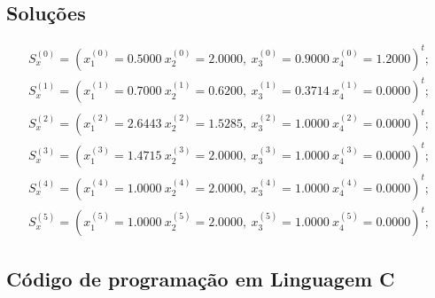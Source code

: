 \documentclass[12pt,a4paper]{article}
\begin{document}
        \subsection{Soluções}

            \begin{align*}
                S_x^{(0)} = (x_1^{(0)} = 0.5000\ x_2^{(0)}= 2.0000,\ x_3^{(0)}= 0.9000\ x_4^{(0)}= 1.2000)^t;\\
                S_x^{(1)} = (x_1^{(1)} = 0.7000\ x_2^{(1)}= 0.6200,\ x_3^{(1)}= 0.3714\ x_4^{(1)}= 0.0000)^t;\\
                S_x^{(2)} = (x_1^{(2)} = 2.6443\ x_2^{(2)}= 1.5285,\ x_3^{(2)}= 1.0000\ x_4^{(2)}= 0.0000)^t;\\
                S_x^{(3)} = (x_1^{(3)} = 1.4715\ x_2^{(3)}= 2.0000,\ x_3^{(3)}= 1.0000\ x_4^{(3)}= 0.0000)^t;\\
                S_x^{(4)} = (x_1^{(4)} = 1.0000\ x_2^{(4)}= 2.0000,\ x_3^{(4)}= 1.0000\ x_4^{(4)}= 0.0000)^t;\\
                S_x^{(5)} = (x_1^{(5)} = 1.0000\ x_2^{(5)}= 2.0000,\ x_3^{(5)}= 1.0000\ x_4^{(5)}= 0.0000)^t;
            \end{align*}

        \newpage

        \subsection{Código de programação em Linguagem C}
\end{document}
